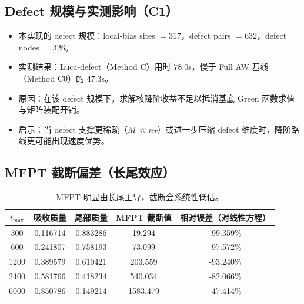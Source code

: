 \documentclass[11pt,a4paper]{ctexart}
\begin{document}
\subsection{Defect 规模与实测影响（C1）}
\begin{itemize}[leftmargin=2em]
  \item 本实现的 defect 规模：local-bias sites $=317$，defect pairs $=632$，defect nodes $=326$。
  \item 实测结果：Luca-defect（Method C）用时 $78.0$s，慢于 Full AW 基线（Method C0）的 $47.3$s。
  \item 原因：在该 defect 规模下，求解核降阶收益不足以抵消基底 Green 函数求值与矩阵装配开销。
  \item 启示：当 defect 支撑更稀疏（$M\ll n_T$）或进一步压缩 defect 维度时，降阶路线更可能出现速度优势。
\end{itemize}

\subsection{MFPT 截断偏差（长尾效应）}
\begin{table}[H]
  \centering
  \small
  \begin{tabular}{ccccc}
    \toprule
    $t_{\max}$ & 吸收质量 & 尾部质量 & MFPT 截断值 & 相对误差（对线性方程） \\
    \midrule
    300 & 0.116714 & 0.883286 & 19.294 & -99.359\% \\
    600 & 0.241807 & 0.758193 & 73.099 & -97.572\% \\
    1200 & 0.389579 & 0.610421 & 203.559 & -93.240\% \\
    2400 & 0.581766 & 0.418234 & 540.034 & -82.066\% \\
    6000 & 0.850786 & 0.149214 & 1583.479 & -47.414\% \\
    \bottomrule
  \end{tabular}
  \caption{MFPT 明显由长尾主导，截断会系统性低估。}
\end{table}
\end{document}
